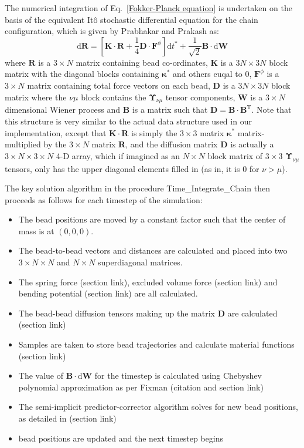 \documentclass{article}
\begin{document}
The numerical integration of Eq.~\eqref{Fokker-Planck equation} is undertaken on the basis of the equivalent It\^{o} stochastic differential equation for the chain configuration, which is given by Prabhakar and Prakash as:
\begin{equation}
\label{Ito SDE}
    \mathrm{d} \bm{R}=\left[\bm{K} \cdot \bm{R}+\frac{1}{4} \bm{D} \cdot \bm{F}^{\phi}\right] \mathrm{d} t^{*}+\frac{1}{\sqrt{2}} \bm{B} \cdot \mathrm{d} \bm{W}
\end{equation}
where $\bm{R}$ is a $3\times N$ matrix containing bead co-ordinates, $\bm{K}$ is a $3N \times 3N$ block matrix with the diagonal blocks containing $\bm{\kappa}^*$ and others euqal to 0, $\bm{F}^{\phi}$ is a $3 \times N$ matrix containing total force vectors on each bead, $\bm{D}$ is a $3N \times 3N$ block matrix where the $\nu \mu$ block contains the $\bm{\Upsilon}_{\nu \mu}$ tensor components, $\bm{W}$ is a $3\times N$ dimensional Wiener process and $\bm{B}$ is a matrix such that $\bm{D} = \bm{B} \cdot \bm{B}^{\mathrm{T}}$.
Note that this structure is very similar to the actual data structure used in our implementation, except that $\bm{K} \cdot \bm{R}$ is simply the $3\times 3$ matrix $\bm{\kappa}^*$ matrix-multiplied by the $3\times N$ matrix $\bm{R}$, and the diffusion matrix $\bm{D}$ is actually a $3 \times N \times 3 \times N$ 4-D array, which if imagined as an $N\times N$ block matrix of $3\times 3$ $\bm{\Upsilon}_{\nu \mu}$ tensors, only has the upper diagonal elements filled in (as in, it is 0 for $\nu > \mu$). 

The key solution algorithm in the procedure Time\_Integrate\_Chain then proceeds as follows for each timestep of the simulation:
\begin{itemize}
    \item The bead positions are moved by a constant factor such that the center of mass is at $(0,0,0)$. 
    \item The bead-to-bead vectors and distances are calculated and placed into two $3 \times N \times N$ and $N \times N$ superdiagonal matrices.
    \item The spring force (section link), excluded volume force (section link) and bending potential (section link) are all calculated.
    \item The bead-bead diffusion tensors making up the matrix $\bm{D}$ are calculated (section link)
    \item Samples are taken to store bead trajectories and calculate material functions (section link)
    \item The value of $\bm{B} \cdot \mathrm{d} \bm{W}$ for the timestep is calculated using Chebyshev polynomial approximation as per Fixman (citation and section link)
    \item The semi-implicit predictor-corrector algorithm solves for new bead positions, as detailed in (section link)
    \item bead positions are updated and the next timestep begins
\end{itemize}
\end{document}
